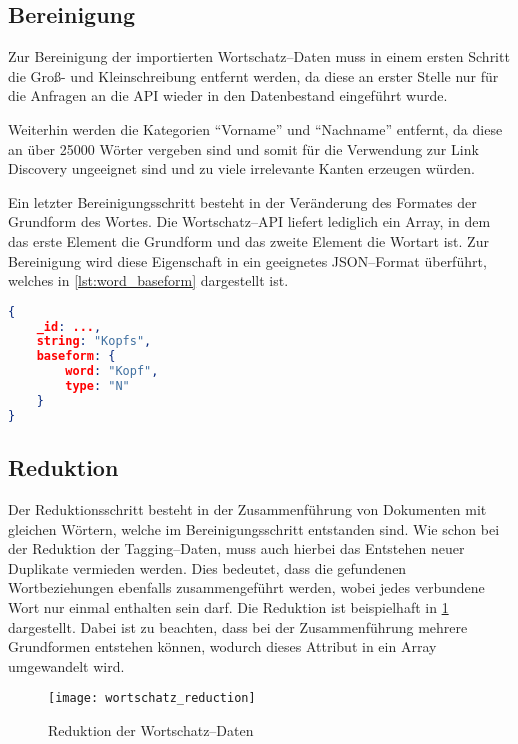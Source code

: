 \subsection{Bereinigung}

Zur Bereinigung der importierten Wortschatz--Daten muss in einem ersten Schritt die Groß- und Kleinschreibung entfernt werden, da diese an erster Stelle nur für die Anfragen an die API wieder in den Datenbestand eingeführt wurde.

Weiterhin werden die Kategorien ``Vorname'' und ``Nachname'' entfernt, da diese an über \num{25000} Wörter vergeben sind und somit für die Verwendung zur Link Discovery ungeeignet sind und zu viele irrelevante Kanten erzeugen würden.

Ein letzter Bereinigungsschritt besteht in der Veränderung des Formates der Grundform des Wortes. Die Wortschatz--API liefert lediglich ein Array, in dem das erste Element die Grundform und das zweite Element die Wortart ist. Zur Bereinigung wird diese Eigenschaft in ein geeignetes JSON--Format überführt, welches in \cref{lst:word_baseform} dargestellt ist.

\begin{lstlisting}[language=json, label={lst:word_baseform}, caption={Grundform eines Wortes}]
{
    _id: ...,
    string: "Kopfs",
    baseform: {
        word: "Kopf",
        type: "N"
    }
}
\end{lstlisting}

\subsection{Reduktion}

Der Reduktionsschritt besteht in der Zusammenführung von Dokumenten mit gleichen Wörtern, welche im Bereinigungsschritt entstanden sind. Wie schon bei der Reduktion der Tagging--Daten, muss auch hierbei das Entstehen neuer Duplikate vermieden werden. Dies bedeutet, dass die gefundenen Wortbeziehungen ebenfalls zusammengeführt werden, wobei jedes verbundene Wort nur einmal enthalten sein darf. Die Reduktion ist beispielhaft in \cref{fig:wortschatz_reduction} dargestellt. Dabei ist zu beachten, dass bei der Zusammenführung mehrere Grundformen entstehen können, wodurch dieses Attribut in ein Array umgewandelt wird.

\begin{figure}
\centering
\texttt{[image: wortschatz\_reduction]}
\caption{Reduktion der Wortschatz--Daten}
\label{fig:wortschatz_reduction}
\end{figure}

